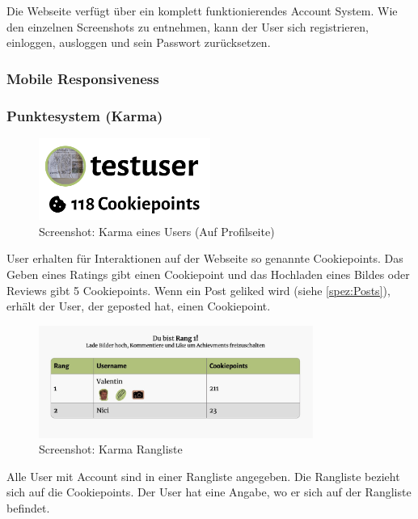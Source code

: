 Die Webseite verfügt über ein komplett funktionierendes Account System. Wie den
einzelnen Screenshots zu entnehmen, kann der User sich registrieren, einloggen,
ausloggen und sein Passwort zurücksetzen.

\subsubsection*{Mobile Responsiveness}

\subsubsection*{Punktesystem (Karma)}

\begin{figure}[ht]
    \centering
    \includegraphics[width=0.5\textwidth]{images/Resultat_Karma.png}
    \caption{Screenshot: Karma eines Users (Auf Profilseite)}
    \label{fig:r-karma}
\end{figure}

User erhalten für Interaktionen auf der Webseite so genannte Cookiepoints. Das
Geben eines Ratings gibt einen Cookiepoint und das Hochladen eines Bildes oder
Reviews gibt 5 Cookiepoints. Wenn ein Post geliked wird (siehe
\ref{spez:Posts}), erhält der User, der geposted hat, einen Cookiepoint. 


\begin{figure}[ht]
    \centering
    \includegraphics[width=0.8\textwidth]{images/Resultat_Rangliste.png}
    \caption{Screenshot: Karma Rangliste}
    \label{fig:r-rangliste}
\end{figure} 

Alle User mit Account sind in einer Rangliste angegeben. Die Rangliste bezieht
sich auf die Cookiepoints. Der User hat eine Angabe, wo er sich auf der
Rangliste befindet.

